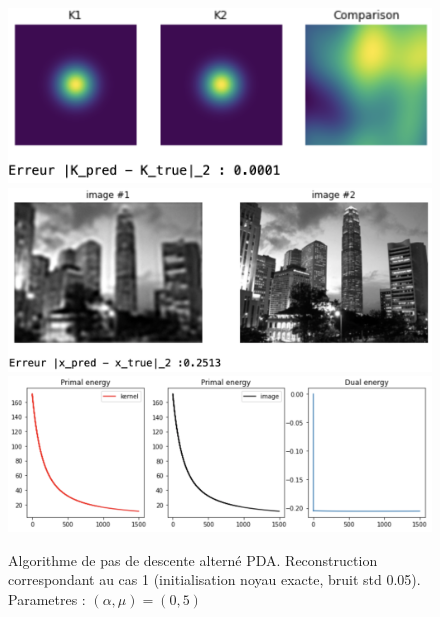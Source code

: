 \documentclass[a4paper]{article}
\begin{document}
\begin{figure}[h]
\includegraphics[scale=0.8]{figures/algov-cas1-kernel}
\includegraphics[scale=0.6]{figures/algov-cas1-image}
\includegraphics[scale=0.6]{figures/algov-cas1-energy}
\caption{Algorithme de pas de descente alterné PDA. Reconstruction correspondant au cas 1  (initialisation noyau exacte, bruit std 0.05). Parametres : $(\alpha,\mu) =(0,5)$}
\end{figure}
\end{document}
